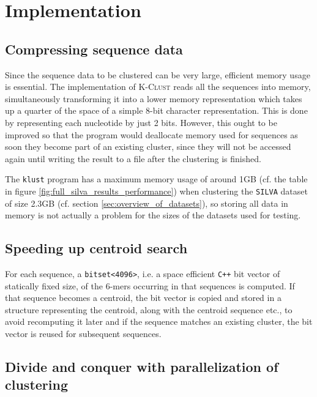 \section{Implementation} \label{sec:implementation}

\subsection{Compressing sequence data}

Since the sequence data to be clustered can be very large, efficient memory
usage is essential. The implementation of \textsc{K-Clust} reads all the
sequences into memory, simultaneously transforming it into a lower memory
representation which takes up a quarter of the space of a simple 8-bit
character representation. This is done by representing each nucleotide by just
2 bits. However, this ought to be improved so that the program would deallocate
memory used for sequences as soon they become part of an existing cluster,
since they will not be accessed again until writing the result to a file after
the clustering is finished.

The \texttt{klust} program has a maximum memory usage of around 1GB (cf. the
table in figure \ref{fig:full_silva_results_performance}) when clustering the
\texttt{SILVA} dataset of size 2.3GB (cf. section
\ref{sec:overview_of_datasets}), so storing all data in memory is not actually
a problem for the sizes of the datasets used for testing.


\subsection{Speeding up centroid search}

For each sequence, a \verb|bitset<4096>|, i.e. a space efficient \texttt{C++}
bit vector of statically fixed size, of the $6$-mers occurring in that
sequences is computed. If that sequence becomes a centroid, the bit vector is
copied and stored in a structure representing the centroid, along with the
centroid sequence etc., to avoid recomputing it later and if the sequence
matches an existing cluster, the bit vector is reused for subsequent sequences.



\subsection{Divide and conquer with parallelization of clustering}

